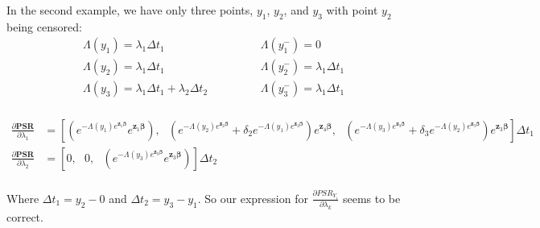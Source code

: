 \documentclass[]{article}
\begin{document}
In the second example, we have only three points, $y_1$, $y_2$, and $y_3$ with point $y_2$ being censored:
{\small{  $$
  \begin{aligned}
  &\Lambda(y_1) = \lambda_1 \Delta t_{1}   ~~&~~&\Lambda(y_1^-) = 0\\
  &\Lambda(y_2) = \lambda_1 \Delta t_{1}   ~~&~~&\Lambda(y_2^-) =\lambda_1 \Delta t_{1}\\
  &\Lambda(y_3) = \lambda_1 \Delta t_{1} + \lambda_2  \Delta t_{2}  ~~~~~~~~~~~~&~~&\Lambda(y_3^-) = \lambda_1 \Delta t_{1} \\
  \end{aligned}
  $$
}}

{\small{
  $$
  \begin{aligned}
    \frac{\partial \pmb{PSR}}{\partial \lambda_1} & = \left[ \left( e^{-\Lambda(y_1)e^{\pmb{z}_1\pmb{\beta}}}  e^{\pmb{z}_1\pmb{\beta}}   \right),  ~~~\left( e^{-\Lambda(y_2)e^{\pmb{z}_2\pmb{\beta}}}   + \delta_2 e^{-\Lambda(y_1)e^{\pmb{z}_2\pmb{\beta}}}  \right)  e^{\pmb{z}_4\pmb{\beta}}  , ~~~\left( e^{-\Lambda(y_3)e^{\pmb{z}_3\pmb{\beta}}}   + \delta_3 e^{-\Lambda(y_2)e^{\pmb{z}_3\pmb{\beta}}}  \right)  e^{\pmb{z}_3\pmb{\beta}}   \right]   \Delta t_{1}  \\
    \frac{\partial \pmb{PSR}}{\partial \lambda_2} & = \left[ 0,    ~~~0, ~~~\left( e^{-\Lambda(y_3)e^{\pmb{z}_3\pmb{\beta}}}  e^{\pmb{z}_3\pmb{\beta}}   \right)   \right]   \Delta t_{2}  \\
  \end{aligned}
  $$
}}

Where $\Delta t_{1} = y_2-0$ and $\Delta t_{2} = y_3 - y_1$.
So our expression for $\frac{\partial PSR_{Y_i}}{\partial \lambda_k}$ seems to be correct.
  
\end{document}
